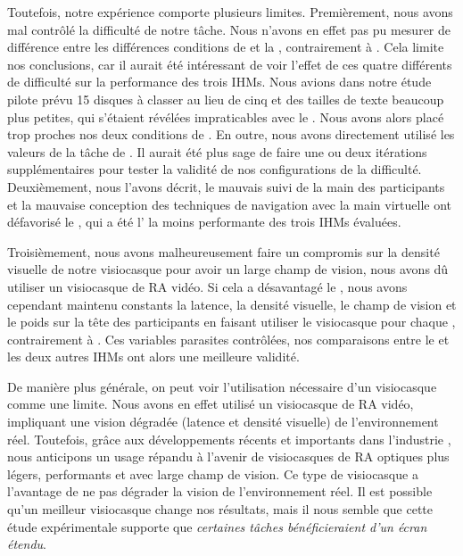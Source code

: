 Toutefois, notre expérience comporte plusieurs limites. Premièrement, nous avons mal contrôlé la difficulté de notre tâche. Nous n'avons en effet pas pu mesurer de différence entre les différences conditions de  et la , contrairement à \cite{Liu2014}. Cela limite nos conclusions, car il aurait été intéressant de voir l'effet de ces quatre différents  de difficulté sur la performance des trois IHMs. Nous avions dans notre étude pilote prévu 15 disques à classer au lieu de cinq et des tailles de texte beaucoup plus petites, qui s'étaient révélées impraticables avec le . Nous avons alors placé trop proches nos deux conditions de . En outre, nous avons directement utilisé les valeurs  de la tâche de \citeauthor{Liu2014}. Il aurait été plus sage de faire une ou deux itérations supplémentaires pour tester la validité de nos configurations de la difficulté. Deuxièmement, nous l'avons décrit, le mauvais suivi de la main des participants et la mauvaise conception des techniques de navigation avec la main virtuelle ont défavorisé le , qui a été l' la moins performante des trois IHMs évaluées.

Troisièmement, nous avons malheureusement faire un compromis sur la densité visuelle de notre visiocasque pour avoir un large champ de vision, nous avons dû utiliser un visiocasque de RA vidéo. Si cela a désavantagé le , nous avons cependant maintenu constants la latence, la densité visuelle, le champ de vision et le poids sur la tête des participants en faisant utiliser le visiocasque pour chaque , contrairement à \cite{Grubert2015}. Ces variables parasites contrôlées, nos comparaisons entre le  et les deux autres IHMs ont alors une meilleure validité.

De manière plus générale, on peut voir l'utilisation nécessaire d'un visiocasque comme une limite. Nous avons en effet utilisé un visiocasque de RA vidéo, impliquant une vision dégradée (latence et densité visuelle) de l'environnement réel. Toutefois, grâce aux développements récents et importants dans l'industrie , nous anticipons un usage répandu à l'avenir de visiocasques de RA optiques plus légers, performants et avec large champ de vision. Ce type de visiocasque a l'avantage de ne pas dégrader la vision de l'environnement réel. Il est possible qu'un meilleur visiocasque change nos résultats, mais il nous semble que cette étude expérimentale supporte que \emph{certaines tâches bénéficieraient d'un écran étendu}.


